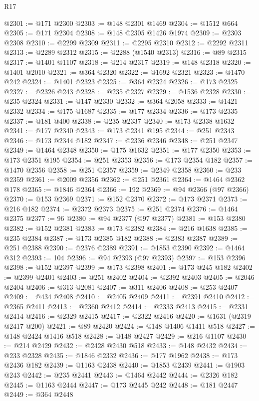 \begin{lexlean}{R17}
\begin{coremodule}
@2301 := @171 @2300
@2303 := @148 @2301 @1469
@2304 := @1512 @664
@2305 := @171 @2304
@2308 := @148 @2305 @1426 @1974
@2309 := @2303 @2308
@2310 := @2299 @2309
@2311 := @2295 @2310
@2312 := @2292 @2311
@2313 := @2289 @2312
@2315 := @2288 (@1540 @2313)
@2316 := @89 @2315
@2317 := @1401 @1107
@2318 := @214 @2317
@2319 := @148 @2318
@2320 := @1401 @2010
@2321 := @364 @2320
@2322 := @1692 @2321
@2323 := @1470 @242
@2324 := @1401 @2323
@2325 := @364 @2324
@2326 := @173 @2325
@2327 := @2326 @243
@2328 := @235 @2327
@2329 := @1536 @2328
@2330 := @235 @2324
@2331 := @147 @2330
@2332 := @364 @2058
@2333 := @1421 @2332
@2334 := @175 @1687
@2335 := @177 @2334
@2336 := @173 @2335
@2337 := @181 @400
@2338 := @235 @2337
@2340 := @173 @2338 @1632
@2341 := @177 @2340
@2343 := @173 @2341 @195
@2344 := @251 @2343
@2346 := @173 @2344 @182
@2347 := @2336 @2346
@2348 := @251 @2347
@2349 := @1464 @2348
@2350 := @175 @1632
@2351 := @177 @2350
@2353 := @173 @2351 @195
@2354 := @251 @2353
@2356 := @173 @2354 @182
@2357 := @1470 @2356
@2358 := @251 @2357
@2359 := @2349 @2358
@2360 := @233 @2359
@2361 := @2009 @2356
@2362 := @251 @2361
@2364 := @1464 @2362 @178
@2365 := @1846 @2364
@2366 := 192
@2369 := @94 @2366 (@97 @2366)
@2370 := @153 @2369
@2371 := @152 @2370
@2372 := @173 @2371
@2373 := @216 @182
@2374 := @2372 @2373
@2375 := @251 @2374
@2376 := @1464 @2375
@2377 := 96
@2380 := @94 @2377 (@97 @2377)
@2381 := @153 @2380
@2382 := @152 @2381
@2383 := @173 @2382
@2384 := @216 @1638
@2385 := @235 @2384
@2387 := @173 @2385 @182
@2388 := @2383 @2387
@2389 := @251 @2388
@2390 := @2376 @2389
@2391 := @1853 @2390
@2392 := @1464 @312
@2393 := 104
@2396 := @94 @2393 (@97 @2393)
@2397 := @153 @2396
@2398 := @152 @2397
@2399 := @173 @2398
@2401 := @173 @245 @182
@2402 := @2399 @2401
@2403 := @251 @2402
@2404 := @2392 @2403
@2405 := @2046 @2404
@2406 := @313 @2081
@2407 := @311 @2406
@2408 := @253 @2407
@2409 := @434 @2408
@2410 := @2405 @2409
@2411 := @2391 @2410
@2412 := @2365 @2411
@2413 := @2360 @2412
@2414 := @2333 @2413
@2415 := @2331 @2414
@2416 := @2329 @2415
@2417 := @2322 @2416
@2420 := @1631 (@2319 @2417 @200)
@2421 := @89 @2420
@2424 := @148 @1406 @1411 @518
@2427 := @148 @2424 @1416 @518
@2428 := @148 @2427
@2429 := @216 @1107
@2430 := @214 @2429
@2432 := @2428 @2430 @518
@2433 := @148 @2432
@2434 := @233 @2328
@2435 := @1846 @2332
@2436 := @177 @1962
@2438 := @173 @2436 @182
@2439 := @1163 @2438
@2440 := @1853 @2439
@2441 := @1903 @243
@2442 := @235 @2441
@2443 := @1464 @2442
@2444 := @2326 @182
@2445 := @1163 @2444
@2447 := @173 @2445 @242
@2448 := @181 @2447
@2449 := @364 @2448

\end{coremodule}
\end{lexlean}
